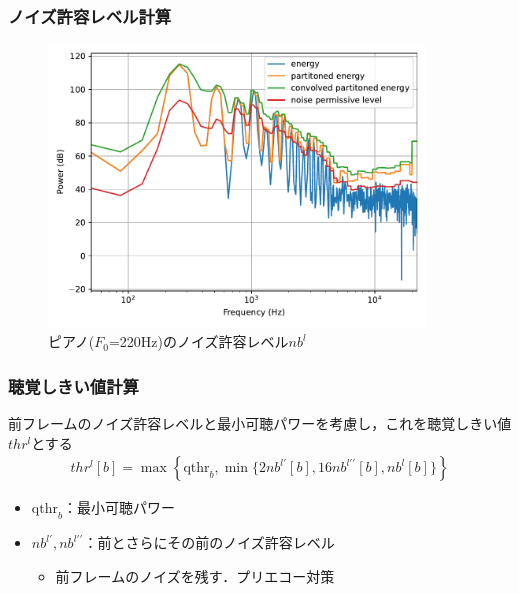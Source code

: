 \documentclass[14pt,xcolor=dvipsnames,table,dvipdfmx]{beamer}
\begin{document}
\begin{frame}[c]
    \frametitle{ノイズ許容レベル計算}
    \begin{figure}
        \includegraphics[width=100mm]{./figs/psyco_analyze_noise_permissive_level.pdf}
        \caption*{ピアノ($F_{0}$=220Hz)のノイズ許容レベル$nb^{l}$}
    \end{figure}
\end{frame}

\begin{frame}[c]
    \frametitle{聴覚しきい値計算}
    前フレームのノイズ許容レベルと最小可聴パワーを考慮し，これを聴覚しきい値$thr^{l}$とする
    \begin{align}
        thr^{l}[b] = \max \left\{ \mathrm{qthr}_{b}, \min \{ 2nb^{l\prime}[b], 16nb^{l\prime\prime}[b], nb^{l}[b] \} \right\}
    \end{align}
    \begin{itemize}
        \item $\mathrm{qthr}_{b}$：最小可聴パワー
        \item $nb^{l\prime}, nb^{l\prime\prime}$：前とさらにその前のノイズ許容レベル
            \begin{itemize}
                \item 前フレームのノイズを残す．プリエコー対策
            \end{itemize}
    \end{itemize}
\end{frame}
\end{document}
